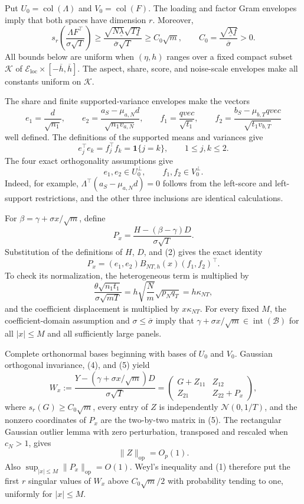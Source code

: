 Put \(U_0=\operatorname{col}(\Lambda)\) and \(V_0=\operatorname{col}(F)\).  The loading and factor Gram envelopes imply that both spaces have dimension \(r\).  Moreover,
\[
 s_r\!\left(\frac{\Lambda F^{\top}}{\sigma\sqrt T}\right)
 \geq
 \frac{\sqrt{N\underline\lambda}\sqrt{T\underline f}}
 {\overline\sigma\sqrt T}
 \geq C_0\sqrt m,
 \qquad C_0=\frac{\sqrt{\underline\lambda\underline f}}{\overline\sigma}>0. \tag{1}
\]
All bounds below are uniform when \((\eta,h)\) ranges over a fixed compact subset \(\mathcal K\) of \(\mathcal E_{\mathrm{loc}}\times[-\overline h,\overline h]\).  The aspect, share, score, and noise-scale envelopes make all constants uniform on \(\mathcal K\).

The share and finite supported-variance envelopes make the vectors
\[
 e_1=\frac d{\sqrt{n_1}},\qquad
 e_2=\frac{a_S-\mu_{a,N}d}{\sqrt{n_1v_{a,N}}},\qquad
 f_1=\frac{qvec}{\sqrt{t_1}},\qquad
 f_2=\frac{b_S-\mu_{b,T}qvec}{\sqrt{t_1v_{b,T}}} \tag{2}
\]
well defined.  The definitions of the supported means and variances give
\[
 e_j^{\top}e_k=f_j^{\top}f_k=\mathbf 1\{j=k\},\qquad 1\leq j,k\leq2. \tag{3}
\]
The four exact orthogonality assumptions give
\[
 e_1,e_2\in U_0^{\perp},\qquad f_1,f_2\in V_0^{\perp}. \tag{4}
\]
Indeed, for example,
\(\Lambda^{\top}(a_S-\mu_{a,N}d)=0\) follows from the left-score and left-support restrictions, and the other three inclusions are identical calculations.

For \(\beta=\gamma+\sigma x/\sqrt m\), define
\[
 P_x=\frac{H-(\beta-\gamma)D}{\sigma\sqrt T}.
\]
Substitution of the definitions of \(H\), \(D\), and (2) gives the exact identity
\[
 P_x=(e_1,e_2)B_{NT,h}(x)(f_1,f_2)^{\top}. \tag{5}
\]
To check its normalization, the heterogeneous term is multiplied by
\[
 \frac{\theta\sqrt{n_1t_1}}{\sigma\sqrt{mT}}
 =h\sqrt{\frac Nm}\sqrt{p_Nq_T}=h\kappa_{NT}, \tag{6}
\]
and the coefficient displacement is multiplied by \(x\kappa_{NT}\).  For every fixed \(M\), the coefficient-domain assumption and \(\sigma\leq\overline\sigma\) imply that \(\gamma+\sigma x/\sqrt m\in\operatorname{int}(\mathcal B)\) for all \(|x|\leq M\) and all sufficiently large panels.

Complete orthonormal bases beginning with bases of \(U_0\) and \(V_0\).  Gaussian orthogonal invariance, (4), and (5) yield
\[
 W_x:=\frac{Y-(\gamma+\sigma x/\sqrt m)D}{\sigma\sqrt T}
 =
 \begin{pmatrix}
 G+Z_{11}&Z_{12}\\
 Z_{21}&Z_{22}+P_x
 \end{pmatrix}, \tag{7}
\]
where \(s_r(G)\geq C_0\sqrt m\), every entry of \(Z\) is independently \(\mathcal N(0,1/T)\), and the nonzero coordinates of \(P_x\) are the two-by-two matrix in (5).  The rectangular Gaussian outlier lemma with zero perturbation, transposed and rescaled when \(c_N>1\), gives
\[
 \|Z\|_{\mathrm{op}}=O_p(1). \tag{8}
\]
Also \(\sup_{|x|\leq M}\|P_x\|_{\mathrm{op}}=O(1)\).  Weyl's inequality and (1) therefore put the first \(r\) singular values of \(W_x\) above \(C_0\sqrt m/2\) with probability tending to one, uniformly for \(|x|\leq M\).

